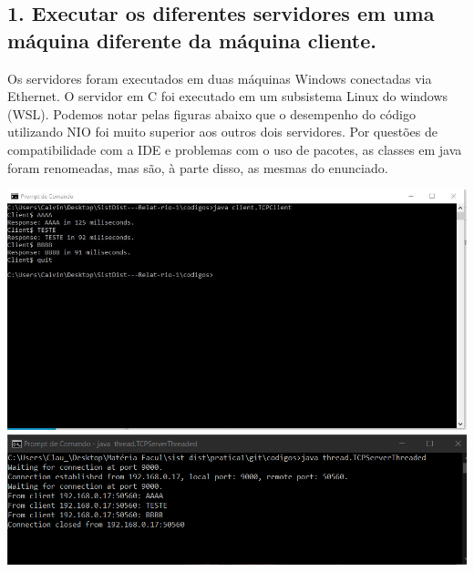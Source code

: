 \subsection*{1. Executar os diferentes servidores em uma máquina diferente da
máquina cliente.}

Os servidores foram executados em duas máquinas Windows conectadas via Ethernet. O servidor em C foi executado em um subsistema Linux do windows (WSL). Podemos notar pelas figuras abaixo que o desempenho do código utilizando NIO foi muito superior aos outros dois servidores. Por questões de compatibilidade com a IDE e problemas com o uso de pacotes, as classes em java foram renomeadas, mas são, à parte disso, as mesmas do enunciado.

\vspace{2em}
\begin{minipage}{\textwidth}
    \hspace{-1em}
    \centering
    \includegraphics[trim= 0 200 250 0, clip, scale=.4] {prints/terminal-cilente-threaded.JPG}
    \includegraphics[scale=.4]{prints/terminal-server-threaded.PNG}
    \label{threadspng}
    \hspace{1em}
\end{minipage}
\vspace{0.5em}

